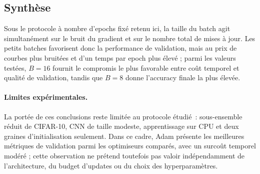 \subsection{Synth\`ese}
Sous le protocole \`a nombre d'epochs fix\'e retenu ici, la taille du batch agit simultan\'ement sur le bruit du gradient et sur le nombre total de mises \`a jour. Les petits batches favorisent donc la performance de validation, mais au prix de courbes plus bruit\'ees et d'un temps par epoch plus \'elev\'e ; parmi les valeurs test\'ees, $B=16$ fournit le compromis le plus favorable entre co\^ut temporel et qualit\'e de validation, tandis que $B=8$ donne l'accuracy finale la plus \'elev\'ee.

\paragraph{Limites exp\'erimentales.}
La port\'ee de ces conclusions reste limit\'ee au protocole \'etudi\'e~: sous-ensemble r\'eduit de CIFAR-10, CNN de taille modeste, apprentissage sur CPU et deux graines d'initialisation seulement. Dans ce cadre, Adam pr\'esente les meilleures m\'etriques de validation parmi les optimiseurs compar\'es, avec un surco\^ut temporel mod\'er\'e ; cette observation ne pr\'etend toutefois pas valoir ind\'ependamment de l'architecture, du budget d'updates ou du choix des hyperparam\`etres.
